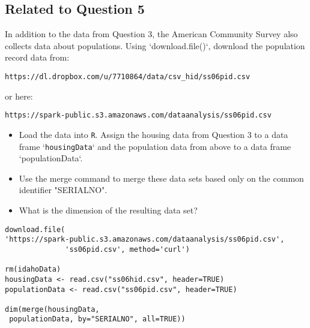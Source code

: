 \documentclass[]{article}
\begin{document}
\subsection*{Related to Question 5}

In addition to the data from Question 3, the American Community Survey also collects data about populations. 
Using `download.file()`, download the population record data from: 

\begin{verbatim}
https://dl.dropbox.com/u/7710864/data/csv_hid/ss06pid.csv 
\end{verbatim}
or here:
\begin{verbatim}
https://spark-public.s3.amazonaws.com/dataanalysis/ss06pid.csv
\end{verbatim}

\begin{itemize}
\item Load the data into \texttt{R}. Assign the housing data from Question 3 to a data frame `\texttt{housingData}` and the population data from above to a data frame `populationData`.

\item Use the merge command to merge these data sets based only on the common identifier "SERIALNO". 

\item What is the dimension of the resulting data set? 
\end{itemize}

\begin{framed} 
\begin{verbatim}
download.file(
'https://spark-public.s3.amazonaws.com/dataanalysis/ss06pid.csv',
              'ss06pid.csv', method='curl')

rm(idahoData)
housingData <- read.csv("ss06hid.csv", header=TRUE)
populationData <- read.csv("ss06pid.csv", header=TRUE)

dim(merge(housingData, 
 populationData, by="SERIALNO", all=TRUE))
\end{verbatim}
\end{framed} 

\end{document}
